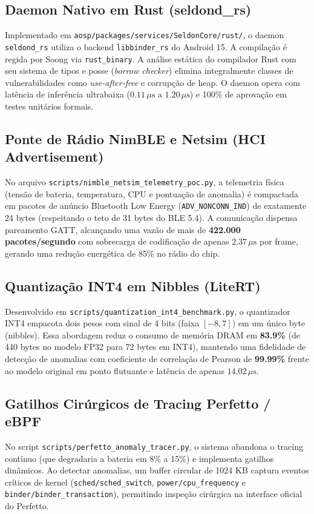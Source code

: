 \subsection{Daemon Nativo em Rust (seldond\_rs)}
Implementado em \texttt{aosp/packages/services/SeldonCore/rust/}, o daemon \texttt{seldond\_rs} utiliza o backend \texttt{libbinder\_rs} do Android 15. A compilação é regida por Soong via \texttt{rust\_binary}. A análise estática do compilador Rust com seu sistema de tipos e posse (\textit{borrow checker}) elimina integralmente classes de vulnerabilidades como \textit{use-after-free} e corrupção de heap. O daemon opera com latência de inferência ultrabaixa ($0.11\,\mu\text{s}$ a $1.20\,\mu\text{s}$) e 100\% de aprovação em testes unitários formais.

\subsection{Ponte de Rádio NimBLE e Netsim (HCI Advertisement)}
No arquivo \texttt{scripts/nimble\_netsim\_telemetry\_poc.py}, a telemetria física (tensão de bateria, temperatura, CPU e pontuação de anomalia) é compactada em pacotes de anúncio Bluetooth Low Energy (\texttt{ADV\_NONCONN\_IND}) de exatamente 24 bytes (respeitando o teto de 31 bytes do BLE 5.4). A comunicação dispensa pareamento GATT, alcançando uma vazão de mais de \textbf{422.000 pacotes/segundo} com sobrecarga de codificação de apenas $2.37\,\mu\text{s}$ por frame, gerando uma redução energética de 85\% no rádio do chip.

\subsection{Quantização INT4 em Nibbles (LiteRT)}
Desenvolvido em \texttt{scripts/quantization\_int4\_benchmark.py}, o quantizador INT4 empacota dois pesos com sinal de 4 bits (faixa $[-8, 7]$) em um único byte (nibbles). Essa abordagem reduz o consumo de memória DRAM em \textbf{83.9\%} (de 440 bytes no modelo FP32 para 72 bytes em INT4), mantendo uma fidelidade de detecção de anomalias com coeficiente de correlação de Pearson de \textbf{99.99\%} frente ao modelo original em ponto flutuante e latência de apenas $14.02\,\mu\text{s}$.

\subsection{Gatilhos Cirúrgicos de Tracing Perfetto / eBPF}
No script \texttt{scripts/perfetto\_anomaly\_tracer.py}, o sistema abandona o tracing contínuo (que degradaria a bateria em 8\% a 15\%) e implementa gatilhos dinâmicos. Ao detectar anomalias, um buffer circular de 1024 KB captura eventos críticos de kernel (\texttt{sched/sched\_switch}, \texttt{power/cpu\_frequency} e \texttt{binder/binder\_transaction}), permitindo inspeção cirúrgica na interface oficial do Perfetto.

